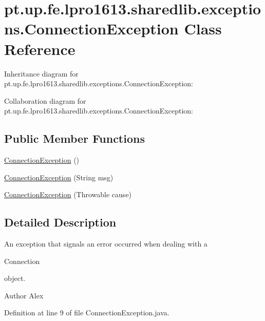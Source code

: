 \hypertarget{classpt_1_1up_1_1fe_1_1lpro1613_1_1sharedlib_1_1exceptions_1_1_connection_exception}{}\section{pt.\+up.\+fe.\+lpro1613.\+sharedlib.\+exceptions.\+Connection\+Exception Class Reference}
\label{classpt_1_1up_1_1fe_1_1lpro1613_1_1sharedlib_1_1exceptions_1_1_connection_exception}


Inheritance diagram for pt.\+up.\+fe.\+lpro1613.\+sharedlib.\+exceptions.\+Connection\+Exception\+:


Collaboration diagram for pt.\+up.\+fe.\+lpro1613.\+sharedlib.\+exceptions.\+Connection\+Exception\+:
\subsection*{Public Member Functions}
\begin{DoxyCompactItemize}
\item 
\hyperlink{classpt_1_1up_1_1fe_1_1lpro1613_1_1sharedlib_1_1exceptions_1_1_connection_exception_a0263c99be76976a295eb555d769ad902}{Connection\+Exception} ()
\item 
\hyperlink{classpt_1_1up_1_1fe_1_1lpro1613_1_1sharedlib_1_1exceptions_1_1_connection_exception_a7ffdcb8ba15364c95b96154fef1624ee}{Connection\+Exception} (String msg)
\item 
\hyperlink{classpt_1_1up_1_1fe_1_1lpro1613_1_1sharedlib_1_1exceptions_1_1_connection_exception_a78daf9e69ac5d62dfc64bca6da1115a7}{Connection\+Exception} (Throwable cause)
\end{DoxyCompactItemize}


\subsection{Detailed Description}
An exception that signals an error occurred when dealing with a 
\begin{DoxyCode}
Connection 
\end{DoxyCode}
 object.

\begin{DoxyAuthor}{Author}
Alex 
\end{DoxyAuthor}


Definition at line 9 of file Connection\+Exception.\+java.



